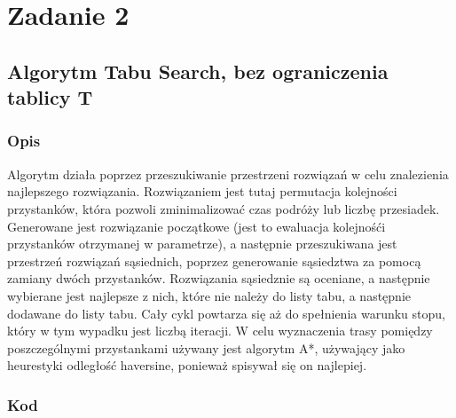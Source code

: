 \documentclass[a4paper, 12pt]{article}
\begin{document}
\section{Zadanie 2}
\subsection{Algorytm Tabu Search, bez ograniczenia tablicy T}
\subsubsection{Opis}

Algorytm działa poprzez przeszukiwanie przestrzeni rozwiązań w celu znalezienia
najlepszego rozwiązania. Rozwiązaniem jest tutaj permutacja kolejności przystanków,
która pozwoli zminimalizować czas podróży lub liczbę przesiadek. 
Generowane jest rozwiązanie początkowe (jest to ewaluacja kolejnośći przystanków 
otrzymanej w parametrze), a następnie przeszukiwana jest przestrzeń rozwiązań
sąsiednich, poprzez generowanie sąsiedztwa za pomocą zamiany dwóch przystanków.
Rozwiązania sąsiedznie są oceniane, a następnie wybierane jest najlepsze z nich,
które nie należy do listy tabu, a następnie dodawane do listy tabu.
Cały cykl powtarza się aż do spełnienia warunku stopu, który 
w tym wypadku jest liczbą iteracji. W celu wyznaczenia trasy pomiędzy poszczególnymi
przystankami używany jest algorytm A*, używający jako heurestyki odległość haversine,
ponieważ spisywał się on najlepiej.

\subsubsection{Kod}
\end{document}
